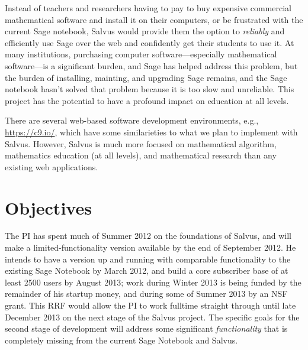 \documentclass[11pt]{article}
\begin{document}
Instead of teachers and researchers having to pay to buy expensive
commercial mathematical software and install it on their computers, or
be frustrated with the current Sage notebook, Salvus would provide
them the option to {\em reliably} and efficiently use Sage over the
web and confidently get their students to use it.  At many
institutions, purchasing computer software---especially mathematical
software---is a significant burden, and Sage has helped address this
problem, but the burden of installing, mainting, and upgrading Sage
remains, and the Sage notebook hasn't solved that problem because it
is too slow and unreliable.  This project has the potential to have a
profound impact on education at all levels.

There are several web-based software development environments, e.g.,
\url{https://c9.io/}, which have some similarieties to what we plan to
implement with Salvus.  However, Salvus is much more focused on
mathematical algorithm, mathematics education (at all levels), and
mathematical research than any existing web applications.

\section{Objectives}

The PI has spent much of Summer 2012 on the foundations of Salvus, and
will make a limited-functionality version available by the end of
September 2012.  He intends to have a version up and running with
comparable functionality to the existing Sage Notebook by March 2012,
and build a core subscriber base of at least 2500 users by August
2013; work during Winter 2013 is being funded by the remainder of his
startup money, and during some of Summer 2013 by an NSF grant.  This
RRF would allow the PI to work fulltime straight through until late
December 2013 on the next stage of the Salvus project. The specific
goals for the second stage of development will address some
significant {\em functionality} that is completely missing from the
current Sage Notebook and Salvus.
\end{document}
